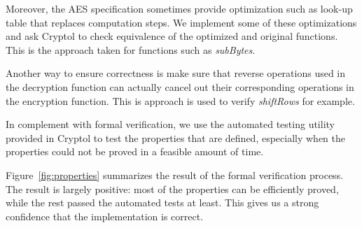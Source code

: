 \documentclass[a4paper, notitlepage]{report}
\begin{document}
Moreover, the AES specification sometimes provide optimization such as look-up table
that replaces computation steps. We implement some of these optimizations and
ask Cryptol to check equivalence of the optimized and original functions. This is
the approach taken for functions such as \emph{subBytes}.

Another way to ensure correctness is make sure that reverse operations used in the
decryption function can actually cancel out their corresponding operations in
the encryption function. This is approach is used to verify \emph{shiftRows} for
example.

In complement with formal verification, we use the automated testing utility
provided in Cryptol to test the properties that are defined, especially when the
properties could not be proved in a feasible amount of time.

Figure~\ref{fig:properties} summarizes the result of the formal verification process.
The result is largely positive: most of the properties can be efficiently proved,
while the rest passed the automated tests at least. This gives us a strong confidence
that the implementation is correct.
\end{document}
